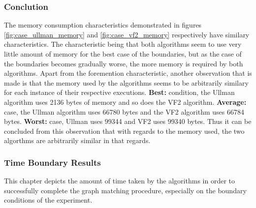 \subsubsection{Conclution}
The memory consumption characteristics demonstrated in figures \ref{fig:case_ullman_memory} and \ref{fig:case_vf2_memory} respectively have similary 
characteristics. The characteristic being that both algorithms seem to use very little amount of memory for the best case of the boundaries, but as the
case of the boundaries becomes gradually worse, the more memory is required by both algorithms.\newline\newline
Apart from the foremention characteristic, another observation that is made is that the memory used by the algorithms seems to be arbitrarily similary 
for each instance of their respective executions. \newline\newline
\textbf{Best:} condition, the Ullman algorithm uses 2136 bytes of memory and so does the VF2 algorithm.\newline\newline
\textbf{Average:} case, the Ullman algorithm uses 66780 bytes and the VF2 algorithm uses 66784 bytes.\newline\newline 
\textbf{Worst:} case, Ullman uses 99344 and VF2 uses 99340 bytes. Thus it can be concluded from this observation that with regards to the memory used, the two algorthms are arbitrarily similar in
that regards.

\newpage

\subsubsection{Time Boundary Results}
\label{Time Boundary Results}
This chapter depicts the amount of time taken by the algorithms in order to successfully complete the graph matching procedure, especially on the 
boundary conditions of the experiment.

